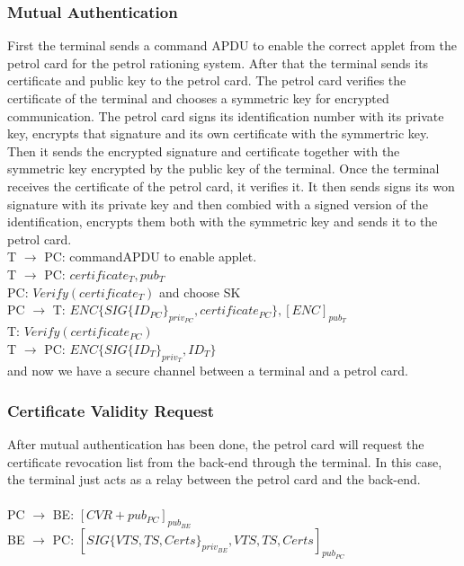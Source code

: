 \subsubsection{Mutual Authentication}
First the terminal sends a command APDU to enable the correct applet from the petrol card for the petrol rationing system. After that the terminal sends its certificate and public key to the petrol card. The petrol card verifies the certificate of the terminal and chooses a symmetric key for encrypted communication. The petrol card signs its identification number with its private key, encrypts that signature and its own certificate with the symmertric key. Then it sends the encrypted signature and certificate together with the symmetric key encrypted by the public key of the terminal. Once the terminal receives the certificate of the petrol card, it verifies it. It then sends signs its won signature with its private key and then combied with a signed version of the identification, encrypts them both with the symmetric key and sends it to the petrol card.
\\

T $\to$ PC: commandAPDU to enable applet.\\
T $\to$ PC: $certificate_{T}, pub_{T}$\\
PC: $Verify(certificate_{T})$ and choose SK\\
PC $\to$ T: $ENC\{SIG\{ID_{PC}\}_{priv_{PC}}, certificate_{PC}\},  [ENC]_{pub_T}$\\
T: $Verify(certificate_{PC})$\\
T $\to$ PC: $ENC\{SIG\{ID_{T}\}_{priv_T}, ID_{T}\}$ \\
and now we have a secure channel between a terminal and a petrol card.

\subsubsection{Certificate Validity Request}
After mutual authentication has been done, the petrol card will request the certificate revocation list from the back-end through the terminal. In this case, the terminal just acts as a relay between the petrol card and the back-end.
\\
\\
PC $\to$ BE: $[CVR + pub_{PC}]_{pub_{BE}}$\\
BE $\to$ PC: $[SIG\{VTS, TS, Certs\}_{priv_{BE}}, VTS, TS, Certs]_{pub_{PC}}$

